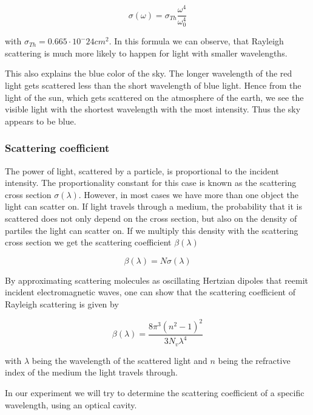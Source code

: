 \documentclass[10pt,a4paper]{article}
\begin{document}
\begin{equation}
\sigma(\omega) = \sigma_{Th} \frac{\omega^4}{\omega_0^4}
\end{equation}

with $\sigma_{Th} = 0.665 \cdot 10^-24 cm^2$. In this formula we can observe, that Rayleigh scattering is much more likely to happen for light with smaller wavelengths.

This also explains the blue color of the sky. The longer wavelength of the red light gets scattered less than the short wavelength of blue light. Hence from the light of the sun, which gets scattered on the atmosphere of the earth, we see the visible light with the shortest wavelength with the most intensity. Thus the sky appears to be blue.

\subsubsection{Scattering coefficient}

The power of light, scattered by a particle, is proportional to the incident intensity. The proportionality constant for this case is known as the scattering cross section $\sigma(\lambda)$. However, in most cases we have more than one object the light can scatter on. If light travels through a medium, the probability that it is scattered does not only depend on the cross section, but also on the density of partiles the light can scatter on. If we multiply this density with the scattering cross section we get the scattering coefficient $\beta(\lambda)$

\begin{equation}
\beta(\lambda) = N \sigma(\lambda)
\end{equation} 

By approximating scattering molecules as oscillating Hertzian dipoles that reemit incident electromagnetic waves, one can show that the scattering coefficient of Rayleigh scattering is given by

\begin{equation}
\beta(\lambda) =  \frac{8 \pi^3 (n^2-1)^2}{3N_{v}\lambda^4}
\end{equation}

with $\lambda$ being the wavelength of the scattered light and $n$ being the refractive index of the medium the light travels through.

In our experiment we will try to determine the scattering coefficient of a specific wavelength, using an optical cavity.
\end{document}
